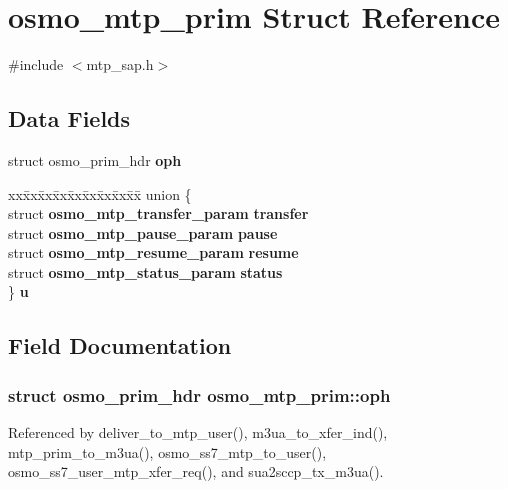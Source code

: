 \section{osmo\+\_\+mtp\+\_\+prim Struct Reference}
\label{structosmo__mtp__prim}


{\ttfamily \#include $<$mtp\+\_\+sap.\+h$>$}

\subsection*{Data Fields}
\begin{DoxyCompactItemize}
\item 
struct osmo\+\_\+prim\+\_\+hdr {\bf oph}
\item 
\begin{tabbing}
xx\=xx\=xx\=xx\=xx\=xx\=xx\=xx\=xx\=\kill
union \{\\
\>struct {\bf osmo\_mtp\_transfer\_param} {\bf transfer}\\
\>struct {\bf osmo\_mtp\_pause\_param} {\bf pause}\\
\>struct {\bf osmo\_mtp\_resume\_param} {\bf resume}\\
\>struct {\bf osmo\_mtp\_status\_param} {\bf status}\\
\} {\bf u}\\

\end{tabbing}\end{DoxyCompactItemize}


\subsection{Field Documentation}
\subsubsection[{oph}]{\setlength{\rightskip}{0pt plus 5cm}struct osmo\+\_\+prim\+\_\+hdr osmo\+\_\+mtp\+\_\+prim\+::oph}\label{structosmo__mtp__prim_acf303b6294b887c076a71c563e7d6fe7}


Referenced by deliver\+\_\+to\+\_\+mtp\+\_\+user(), m3ua\+\_\+to\+\_\+xfer\+\_\+ind(), mtp\+\_\+prim\+\_\+to\+\_\+m3ua(), osmo\+\_\+ss7\+\_\+mtp\+\_\+to\+\_\+user(), osmo\+\_\+ss7\+\_\+user\+\_\+mtp\+\_\+xfer\+\_\+req(), and sua2sccp\+\_\+tx\+\_\+m3ua().

